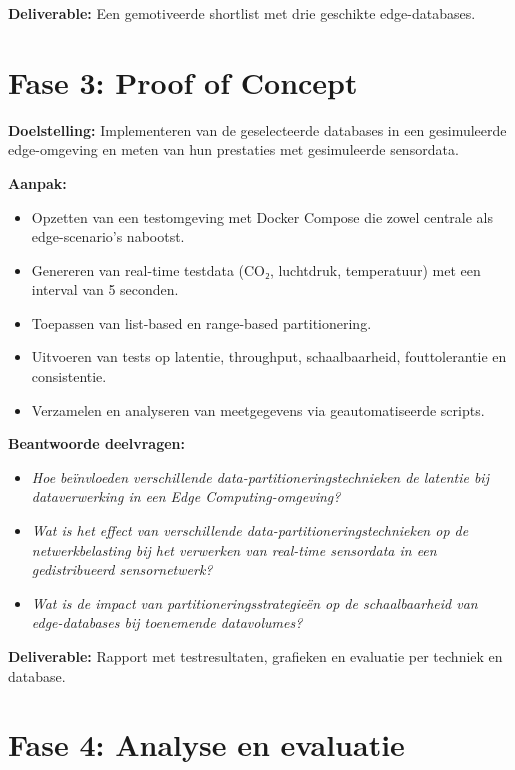 \textbf{Deliverable:} Een gemotiveerde shortlist met drie geschikte edge-databases.\\

\section*{Fase 3: Proof of Concept}

\textbf{Doelstelling:}  
Implementeren van de geselecteerde databases in een gesimuleerde edge-omgeving en meten van hun prestaties met gesimuleerde sensordata.

\textbf{Aanpak:}
\begin{itemize}
    \item Opzetten van een testomgeving met Docker Compose die zowel centrale als edge-scenario's nabootst.
    \item Genereren van real-time testdata (CO₂, luchtdruk, temperatuur) met een interval van 5 seconden.
    \item Toepassen van list-based en range-based partitionering.
    \item Uitvoeren van tests op latentie, throughput, schaalbaarheid, fouttolerantie en consistentie.
    \item Verzamelen en analyseren van meetgegevens via geautomatiseerde scripts.
\end{itemize}

\textbf{Beantwoorde deelvragen:}
\begin{itemize}
    \item \emph{Hoe beïnvloeden verschillende data-partitioneringstechnieken de latentie bij dataverwerking in een Edge Computing-omgeving?}
    \item \emph{Wat is het effect van verschillende data-partitioneringstechnieken op de netwerkbelasting bij het verwerken van real-time sensordata in een gedistribueerd sensornetwerk?}
    \item \emph{Wat is de impact van partitioneringsstrategieën op de schaalbaarheid van edge-databases bij toenemende datavolumes?}
\end{itemize}

\textbf{Deliverable:} Rapport met testresultaten, grafieken en evaluatie per techniek en database.\\

\section*{Fase 4: Analyse en evaluatie}

